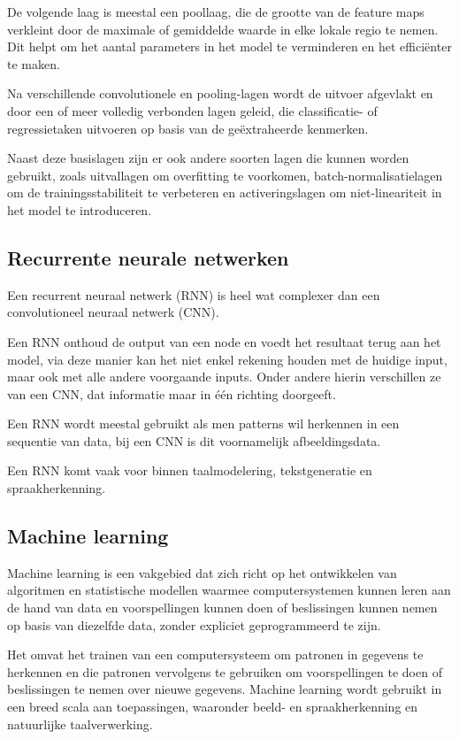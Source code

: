 De volgende laag is meestal een poollaag, die de grootte van de feature maps verkleint door de maximale of gemiddelde waarde in elke lokale regio te nemen. Dit helpt om het aantal parameters in het model te verminderen en het efficiënter te maken.

Na verschillende convolutionele en pooling-lagen wordt de uitvoer afgevlakt en door een of meer volledig verbonden lagen geleid, die classificatie- of regressietaken uitvoeren op basis van de geëxtraheerde kenmerken.

Naast deze basislagen zijn er ook andere soorten lagen die kunnen worden gebruikt, zoals uitvallagen om overfitting te voorkomen, batch-normalisatielagen om de trainingsstabiliteit te verbeteren en activeringslagen om niet-lineariteit in het model te introduceren.

\cite{li2021survey}

\subsection{Recurrente neurale netwerken}

Een recurrent neuraal netwerk (RNN) is heel wat complexer dan een convolutioneel neuraal netwerk (CNN). 

Een RNN onthoud de output van een node en voedt het resultaat terug aan het model, via deze manier kan het niet enkel rekening houden met de huidige input, maar ook met alle andere voorgaande inputs. Onder andere hierin verschillen ze van een CNN, dat informatie maar in één richting doorgeeft.

Een RNN wordt meestal gebruikt als men patterns wil herkennen in een sequentie van data, bij een CNN is dit voornamelijk afbeeldingsdata.

Een RNN komt vaak voor binnen taalmodelering, tekstgeneratie en spraakherkenning.

\cite{schmidt2019recurrent}

\subsection{Machine learning}

Machine learning is een vakgebied dat zich richt op het ontwikkelen van algoritmen en statistische modellen waarmee computersystemen kunnen leren aan de hand van data en voorspellingen kunnen doen of beslissingen kunnen nemen op basis van diezelfde data, zonder expliciet geprogrammeerd te zijn. 

Het omvat het trainen van een computersysteem om patronen in gegevens te herkennen en die patronen vervolgens te gebruiken om voorspellingen te doen of beslissingen te nemen over nieuwe gegevens. Machine learning wordt gebruikt in een breed scala aan toepassingen, waaronder beeld- en spraakherkenning en natuurlijke taalverwerking.

